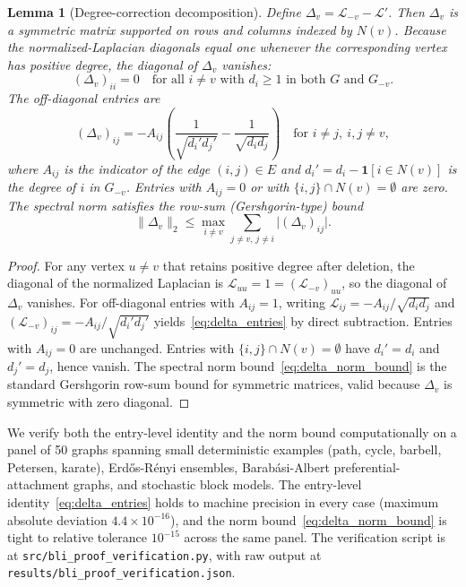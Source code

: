\documentclass[12pt, a4paper]{article}
\newtheorem{lemma}{Lemma}
\begin{document}
\begin{lemma}[Degree-correction decomposition]\label{lem:degree_correction}
Define $\Delta_v = \mathcal{L}_{-v} - \mathcal{L}'$. Then $\Delta_v$ is a symmetric matrix supported on rows and columns indexed by $N(v)$. Because the normalized-Laplacian diagonals equal one whenever the corresponding vertex has positive degree, the diagonal of $\Delta_v$ vanishes:
\begin{equation*}
(\Delta_v)_{ii} = 0 \quad \text{for all } i \neq v \text{ with } d_i \geq 1 \text{ in both } G \text{ and } G_{-v}.
\end{equation*}
The off-diagonal entries are
\begin{equation}\label{eq:delta_entries}
(\Delta_v)_{ij} = -A_{ij}\left(\dfrac{1}{\sqrt{d_i' d_j'}} - \dfrac{1}{\sqrt{d_i d_j}}\right) \quad \text{for } i \neq j,\ i, j \neq v,
\end{equation}
where $A_{ij}$ is the indicator of the edge $(i, j) \in E$ and $d_i' = d_i - \mathbf{1}[i \in N(v)]$ is the degree of $i$ in $G_{-v}$. Entries with $A_{ij} = 0$ or with $\{i, j\} \cap N(v) = \emptyset$ are zero. The spectral norm satisfies the row-sum (Gershgorin-type) bound
\begin{equation}\label{eq:delta_norm_bound}
\lVert \Delta_v \rVert_2 \leq \max_{i \neq v} \sum_{j \neq v,\, j \neq i} \lvert (\Delta_v)_{ij} \rvert.
\end{equation}
\end{lemma}

\begin{proof}
For any vertex $u \neq v$ that retains positive degree after deletion, the diagonal of the normalized Laplacian is $\mathcal{L}_{uu} = 1 = (\mathcal{L}_{-v})_{uu}$, so the diagonal of $\Delta_v$ vanishes. For off-diagonal entries with $A_{ij} = 1$, writing $\mathcal{L}_{ij} = -A_{ij}/\sqrt{d_i d_j}$ and $(\mathcal{L}_{-v})_{ij} = -A_{ij}/\sqrt{d_i' d_j'}$ yields~\eqref{eq:delta_entries} by direct subtraction. Entries with $A_{ij} = 0$ are unchanged. Entries with $\{i, j\} \cap N(v) = \emptyset$ have $d_i' = d_i$ and $d_j' = d_j$, hence vanish. The spectral norm bound~\eqref{eq:delta_norm_bound} is the standard Gershgorin row-sum bound for symmetric matrices, valid because $\Delta_v$ is symmetric with zero diagonal.
\end{proof}

We verify both the entry-level identity and the norm bound computationally on a panel of 50 graphs spanning small deterministic examples (path, cycle, barbell, Petersen, karate), Erd\H{o}s-R\'enyi ensembles, Barab\'asi-Albert preferential-attachment graphs, and stochastic block models. The entry-level identity~\eqref{eq:delta_entries} holds to machine precision in every case (maximum absolute deviation $4.4 \times 10^{-16}$), and the norm bound~\eqref{eq:delta_norm_bound} is tight to relative tolerance $10^{-15}$ across the same panel. The verification script is at \texttt{src/bli\_proof\_verification.py}, with raw output at \texttt{results/bli\_proof\_verification.json}.
\end{document}
